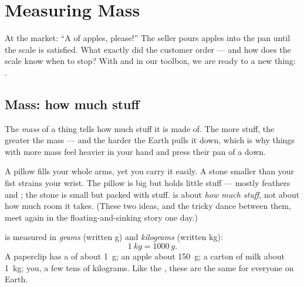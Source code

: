 \chapter{Measuring Mass}\label{ch:g3:measuring-mass}

At the market: ``A  of apples, please!'' The seller pours
apples into the pan until the scale is satisfied. What exactly did
the customer order --- and how does the scale know when to stop?
With  and  in our toolbox, we are ready to
 a new thing: .

\section{Mass: how much stuff}

\begin{definition}[Mass]\label{def:g3:measuring-mass:mass}
The \emph{mass} of a thing tells how much stuff it is
made of. The more stuff, the greater the mass --- and the harder the
Earth pulls it down, which is why things with more mass feel heavier
in your hand and press their pan of a  down.
\end{definition}

\begin{example}\label{ex:g3:measuring-mass:bignotcheavy}
A pillow fills your whole arms, yet you carry it easily. A stone
smaller than your fist strains your wrist. The pillow is big but
holds little stuff --- mostly feathers and ; the stone is small
but packed with stuff.  is about \emph{how much stuff}, not
about how much room it takes. (These two ideas, and the tricky
dance between them, meet again in the floating-and-sinking story
one day.)
\end{example}

\begin{definition}\label{def:g3:measuring-mass:units}
 is measured in \emph{grams} (written \unit{g}) and
\emph{kilograms} (written \unit{kg}):
\[
\qty{1}{kg} = \qty{1000}{g}.
\]
A paperclip has a  of about \qty{1}{g}; an apple about
\qty{150}{g}; a carton of milk about \qty{1}{kg}; you, a few tens
of kilograms. Like the , these  are the same for everyone
on Earth.
\end{definition}

